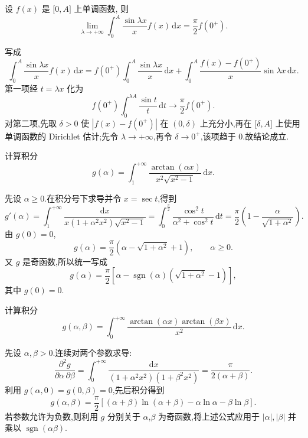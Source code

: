 \begin{example}[\markstar]
    设 $f(x)$ 是 $\lbrack0,A\rbrack$ 上单调函数, 则
    \[
        \displaystyle\lim\limits_{\lambda\to+\infty}\int_0^A\dfrac{\sin\lambda x}{x}f(x)\,\mathrm{d}x
        =\dfrac{\pi}{2}f(0^+).
    \]
\end{example}
\exampleblank

\begin{solution}
    写成
    \[
        \displaystyle\int_0^A\dfrac{\sin\lambda x}{x}f(x)\,\mathrm{d}x
        =f(0^+)\int_0^A\dfrac{\sin\lambda x}{x}\,\mathrm{d}x
        +\int_0^A\dfrac{f(x)-f(0^+)}{x}\sin\lambda x\,\mathrm{d}x.
    \]
    第一项经 $t=\lambda x$ 化为
    \[
        f(0^+)\int_0^{\lambda A}\dfrac{\sin t}{t}\,\mathrm{d}t
        \longrightarrow\dfrac{\pi}{2}f(0^+).
    \]
    对第二项,先取 $\delta>0$ 使 $|f(x)-f(0^+)|$ 在 $(0,\delta)$ 上充分小,再在
    $\lbrack\delta,A\rbrack$ 上使用单调函数的 Dirichlet 估计;先令 $\lambda\to+\infty$,再令 $\delta\to0^+$,该项趋于 $0$.故结论成立.
\end{solution}

\begin{example}
    计算积分
    \[
        g(\alpha)=\int_1^{+\infty}\dfrac{\arctan(\alpha x)}{x^2\sqrt{x^2-1}}\,\mathrm{d}x.
    \]
\end{example}
\exampleblank

\begin{solution}
    先设 $\alpha\geq0$.在积分号下求导并令 $x=\sec t$,得到
    \[
        g'(\alpha)=\int_1^{+\infty}\dfrac{\mathrm{d}x}{x(1+\alpha^2x^2)\sqrt{x^2-1}}
        =\int_0^{\frac{\pi}{2}}\dfrac{\cos^2t}{\alpha^2+\cos^2t}\,\mathrm{d}t
        =\dfrac{\pi}{2}\left(1-\dfrac{\alpha}{\sqrt{1+\alpha^2}}\right).
    \]
    由 $g(0)=0$,
    \[
        g(\alpha)=\dfrac{\pi}{2}\left(\alpha-\sqrt{1+\alpha^2}+1\right),
        \qquad \alpha\geq0.
    \]
    又 $g$ 是奇函数,所以统一写成
    \[
        g(\alpha)=\dfrac{\pi}{2}\left[\alpha-\operatorname{sgn}(\alpha)
            \left(\sqrt{1+\alpha^2}-1\right)\right],
    \]
    其中 $g(0)=0$.
\end{solution}

\begin{example}
    计算积分
    \[
        g(\alpha,\beta)=\int_0^{+\infty}\dfrac{\arctan(\alpha x)\arctan(\beta x)}{x^2}\,\mathrm{d}x.
    \]
\end{example}
\exampleblank

\begin{solution}
    先设 $\alpha,\beta>0$.连续对两个参数求导:
    \[
        \dfrac{\partial^2g}{\partial\alpha\,\partial\beta}
        =\int_0^{+\infty}\dfrac{\mathrm{d}x}{(1+\alpha^2x^2)(1+\beta^2x^2)}
        =\dfrac{\pi}{2(\alpha+\beta)}.
    \]
    利用 $g(\alpha,0)=g(0,\beta)=0$,先后积分得到
    \[
        g(\alpha,\beta)=\dfrac{\pi}{2}\left[(\alpha+\beta)\ln(\alpha+\beta)
            -\alpha\ln\alpha-\beta\ln\beta\right].
    \]
    若参数允许为负数,则利用 $g$ 分别关于 $\alpha$,$\beta$ 为奇函数,将上述公式应用于
    $|\alpha|,|\beta|$ 并乘以 $\operatorname{sgn}(\alpha\beta)$.
\end{solution}

